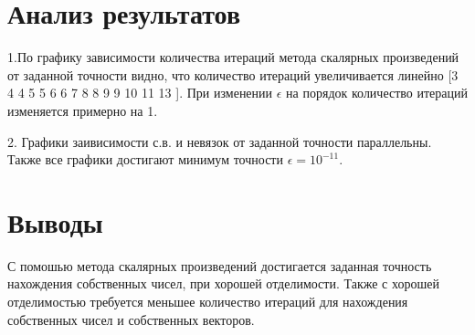 \documentclass{article}
\begin{document}
	
	\section{Анализ результатов}
	1.По графику зависимости количества итераций метода скалярных произведений от заданной точности видно, что количество итераций увеличивается линейно [3 4 4 5 5 6 6 7 8 8 9 9 10 11 13 ].
	При изменении $\epsilon$ на порядок количество итераций изменяется примерно на 1. 
	
	2. Графики заивисимости с.в. и невязок от заданной точности параллельны. Также все графики достигают минимум точности $\epsilon = 10^{-11}$.
	
	
	\section{Выводы}
	С помошью метода скалярных произведений достигается заданная точность нахождения собственных чисел, при хорошей отделимости.
	Также с хорошей отделимостью требуется меньшее количество итераций для нахождения собственных чисел и собственных векторов.
	
\end{document}

